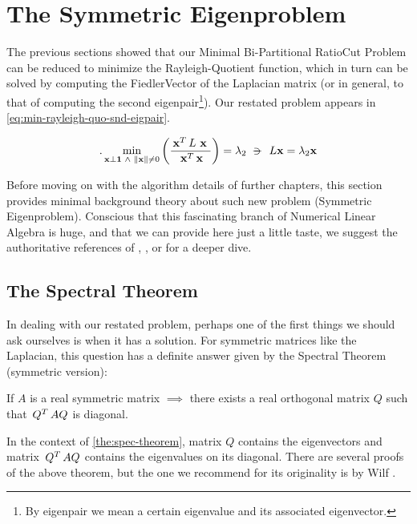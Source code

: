 \section{The Symmetric Eigenproblem}

The previous sections showed that our Minimal Bi-Partitional RatioCut
Problem can be reduced to minimize the Rayleigh-Quotient function,
which in turn can be solved by computing the \gls{FiedlerVector} of the
\gls{Laplacian} matrix (or in general, to that of computing the second
eigenpair\footnote{By eigenpair we mean a certain eigenvalue and its
  associated eigenvector.}). Our restated problem appears in
\cref{eq:min-rayleigh-quo-snd-eigpair}.

\begin{equation}
  \label{eq:min-rayleigh-quo-snd-eigpair}.  
  \min\limits_{\vec{x} \bot \vec{1} \ds{\land} \norm{\vec{x}} \ne 0}
  \left(  
  \dfrac{\trans{\vec{x}} L \ds{\vec{x}}}{\trans{\vec{x}} \vec{x}}
  \right)
  = \lambda_2
  \suchthat{L\vec{x} = \lambda_2\vec{x}}  
\end{equation}
\joinbelow{1cm}

Before moving on with the algorithm
details of further chapters, this section provides minimal background
theory about such new problem (Symmetric Eigenproblem). Conscious
that this fascinating branch of 
Numerical Linear Algebra is huge, and that we can provide here just a
little taste, we suggest the authoritative references of
\cite{parlett80}, \cite{saad92}, \cite{cullum02} or \cite{bai00} for a
deeper dive. 

\subsection{The Spectral Theorem}

In dealing with our restated problem, perhaps one of the first things
we should ask ourselves is when it has a solution. For symmetric
matrices like the \gls{Laplacian}, this question has a definite answer given
by the Spectral Theorem (symmetric version):

\begin{theorem}
\label{the:spec-theorem}
If $A$ is a real symmetric matrix $\implies$ there exists a real orthogonal matrix $Q$ such that $\,{Q}^{T}\,AQ$ is diagonal. 
\end{theorem}
\joinbelow{1cm}

In the context of \cref{the:spec-theorem}, matrix $Q$ contains the
eigenvectors and matrix $\,{Q}^{T}\,AQ$ contains the eigenvalues on its
diagonal. There are several proofs of the above theorem, but the one we
recommend for its originality is by Wilf \cite{wilf81}.

